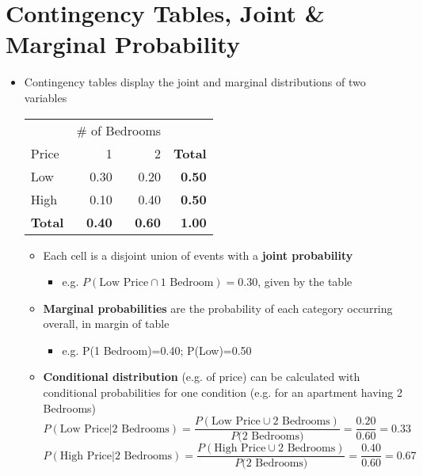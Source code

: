 \documentclass{article}
\begin{document}
\section{Contingency Tables, Joint \& Marginal Probability} 
\begin{itemize}
	\item Contingency tables display the joint and marginal distributions of two variables 
			\begin{table}[h!]
			\centering 
			\begin{tabular}{lrrr}
			& \multicolumn{2}{c}{\# of Bedrooms} & \\ \cmidrule{2-3}
			Price & 1 & 2 & \textbf{Total}\\ \toprule 
			Low & 0.30 & 0.20 & \textbf{0.50}\\
			High & 0.10 & 0.40 & \textbf{0.50}\\ \midrule 
			\textbf{Total} & \textbf{0.40} & \textbf{0.60} & \textbf{1.00} \\ \bottomrule 
			\end{tabular}
		\end{table}
	\begin{itemize}
		\item Each cell is a disjoint union of events with a \textbf{joint probability} 
		\begin{itemize}
			\item e.g. $P(\text{Low Price} \cap \text{1 Bedroom})=0.30$, given by the table 	
		\end{itemize}
		\item \textbf{Marginal probabilities} are the probability of each category occurring overall, in margin of table
		\begin{itemize}
			\item e.g. P(1 Bedroom)=0.40; P(Low)=0.50
		\end{itemize} 
		\item \textbf{Conditional distribution} (e.g. of price) can be calculated with conditional probabilities for one condition (e.g. for an apartment having 2 Bedrooms)
		\begin{equation*}
		P(\text{Low Price}|\text{2 Bedrooms})=\frac{P(\text{Low Price}\cup \text{2 Bedrooms})}{P(\text{2 Bedrooms)}}=\frac{0.20}{0.60}=0.33	
		\end{equation*}
		\begin{equation*}
		P(\text{High Price}|\text{2 Bedrooms})=\frac{P(\text{High Price}\cup \text{2 Bedrooms})}{P(\text{2 Bedrooms)}}=\frac{0.40}{0.60}=0.67	
		\end{equation*}
\end{itemize}
\end{itemize}
\end{document}
